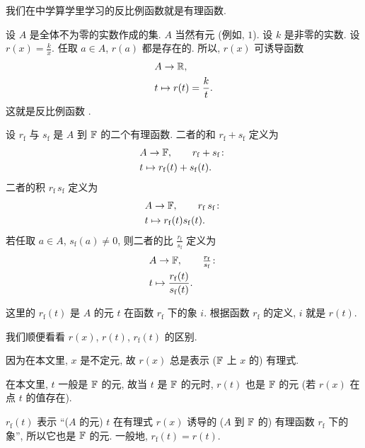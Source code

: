 我们在中学算学里学习的反比例函数就是有理函数.

\begin{example}
    设 $A$ 是全体不为零的实数作成的集. $A$ 当然有元 (例如, $1$). 设 $k$ 是非零的实数. 设 $r(x) = \frac{k}{x}$. 任取 $a \in A$, $r(a)$ 都是存在的. 所以, $r(x)$ 可诱导函数
    \begin{align*}
         & A \to \mathbb{R},                    \\
         & t \mapsto r(t) = \frac{k}{t}.
    \end{align*}
    这就是反比例函数 .
\end{example}

\begin{definition}
    设 $r_\mathrm{f}$ 与 $s_\mathrm{f}$ 是 $A$ 到 $\mathbb{F}$ 的二个有理函数. 二者的和 $r_\mathrm{f} + s_\mathrm{f}$ 定义为
    \begin{align*}
         & A \to \FF, \tag*{$r_\mathrm{f} + s_\mathrm{f} \colon$} \\
         & t \mapsto r_\mathrm{f} (t) + s_\mathrm{f} (t).
    \end{align*}
    二者的积 $r_\mathrm{f} \, s_\mathrm{f}$ 定义为
    \begin{align*}
         & A \to \FF, \tag*{$r_\mathrm{f} \, s_\mathrm{f} \colon$} \\
         & t \mapsto r_\mathrm{f} (t) s_\mathrm{f} (t).
    \end{align*}
    若任取 $a \in A$, $s_\mathrm{f} (a) \neq 0$, 则二者的比 $\frac{r_\mathrm{f}}{s_\mathrm{f}}$ 定义为
    \begin{align*}
         & A \to \FF, \tag*{$\frac{r_\mathrm{f}}{s_\mathrm{f}} \colon$} \\
         & t \mapsto \frac{r_\mathrm{f} (t)}{s_\mathrm{f} (t)}.
    \end{align*}
\end{definition}

\begin{remark}
    这里的 $r_{\mathrm{f}} (t)$ 是 $A$ 的元 $t$ 在函数 $r_{\mathrm{f}}$ 下的象 $i$. 根据函数 $r_{\mathrm{f}}$ 的定义, $i$ 就是 $r(t)$.

    我们顺便看看 $r(x)$, $r(t)$, $r_\mathrm{f} (t)$ 的区别.

    因为在本文里, $x$ 是不定元, 故 $r(x)$ 总是表示 ($\mathbb{F}$ 上 $x$ 的) 有理式.

    在本文里, $t$ 一般是 $\mathbb{F}$ 的元, 故当 $t$ 是 $\mathbb{F}$ 的元时, $r(t)$ 也是 $\mathbb{F}$ 的元 (若 $r(x)$ 在点 $t$ 的值存在).

    $r_\mathrm{f} (t)$ 表示 ``($A$ 的元) $t$ 在有理式 $r(x)$ 诱导的 ($A$ 到 $\mathbb{F}$ 的) 有理函数 $r_\mathrm{f}$ 下的象'', 所以它也是 $\mathbb{F}$ 的元. 一般地, $r_\mathrm{f} (t) = r(t)$.
\end{remark}


